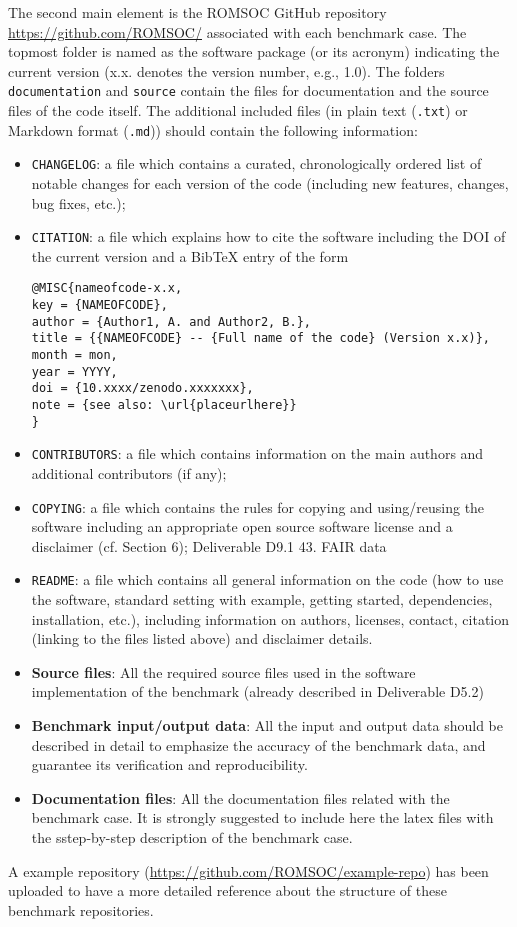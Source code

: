 The second main element is the ROMSOC GitHub repository \url{https://github.com/ROMSOC/} associated with each benchmark case. The topmost folder is named as the software package (or its acronym) indicating the current version (x.x. denotes the version number, e.g., 1.0). The folders \texttt{documentation} and \texttt{source} contain the files for documentation and the source files of the code itself. The additional included files (in plain text (\texttt{.txt}) or Markdown format (\texttt{.md}))
should contain the following information:
\begin{itemize}
\item \texttt{CHANGELOG}: a file which contains a curated, chronologically ordered list of notable changes for each
version of the code (including new features, changes, bug fixes, etc.);
\item \texttt{CITATION}: a file which explains how to cite the software including the DOI of the current version and
a BibTeX entry of the form
\begin{verbatim}
@MISC{nameofcode-x.x,
key = {NAMEOFCODE},
author = {Author1, A. and Author2, B.},
title = {{NAMEOFCODE} -- {Full name of the code} (Version x.x)},
month = mon,
year = YYYY,
doi = {10.xxxx/zenodo.xxxxxxx},
note = {see also: \url{placeurlhere}}
}
\end{verbatim}
\item  \texttt{CONTRIBUTORS}: a file which contains information on the main authors and additional contributors (if
any);
\item \texttt{COPYING}: a file which contains the rules for copying and using/reusing the software including an appropriate open source software license and a disclaimer (cf. Section 6);
Deliverable D9.1
43. FAIR data
\item \texttt{README}: a file which contains all general information on the code (how to use the software, standard
setting with example, getting started, dependencies, installation, etc.), including information on authors,
licenses, contact, citation (linking to the files listed above) and disclaimer details.
\item \textbf{Source files}: All the required source files used in the software implementation of the benchmark (already described in Deliverable D5.2)
\item \textbf{Benchmark input/output data}: All the input and output data should be described in detail to emphasize the accuracy of the benchmark data, and guarantee its verification and reproducibility. 
\item \textbf{Documentation files}: All the documentation files related with the benchmark case. It is strongly suggested to include here the latex files with the sstep-by-step description of the benchmark case.
\end{itemize}
A example repository (\url{https://github.com/ROMSOC/example-repo}) has been uploaded to have a more detailed reference about the structure of these benchmark repositories.

